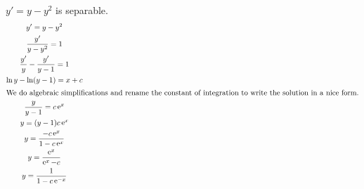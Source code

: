 \begin{QuizSolution}
  \label{quiz solution y' = y + y2}
  $y' = y - y^2$ is separable.
  \begin{gather*}
    y' = y - y^2 
    \\
    \frac{y'}{y - y^2} = 1 
    \\
    \frac{y'}{y} - \frac{y'}{y - 1} = 1 
    \\
    \ln y - \ln(y - 1) = x + c 
    \\
    \intertext{We do algebraic simplifications and rename the constant 
      of integration to write the solution in a nice form.}
    \frac{y}{y-1} = c \mathop{\mathrm{e}}\nolimits^x 
    \\
    y = (y - 1) c \mathop{\mathrm{e}}\nolimits^x 
    \\
    y = \frac{-c \mathop{\mathrm{e}}\nolimits^x}{1 - c \mathop{\mathrm{e}}\nolimits^x} 
    \\
    y = \frac{\mathop{\mathrm{e}}\nolimits^x}{\mathop{\mathrm{e}}\nolimits^x - c} 
    \\
    y = \frac{1}{1 - c \mathop{\mathrm{e}}\nolimits^{-x}} 
  \end{gather*}
\end{QuizSolution}










\raggedbottom
